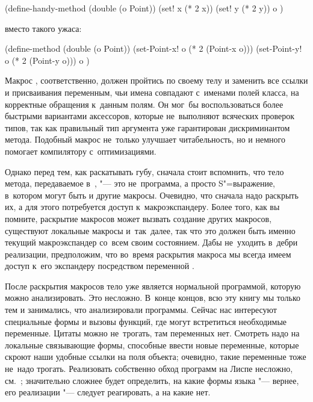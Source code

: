 \begin{code:lisp}
(define-handy-method (double (o Point))
  (set! x (* 2 x))
  (set! y (* 2 y))
  o )
\end{code:lisp}

\noindent
вместо такого ужаса:

\begin{code:lisp}
(define-method (double (o Point))
  (set-Point-x! o (* 2 (Point-x o)))
  (set-Point-y! o (* 2 (Point-y o)))
  o )
\end{code:lisp}

Макрос , соответственно, должен пройтись по своему телу
и заменить все ссылки и присваивания переменным, чьи имена совпадают с~именами
полей класса, на корректные обращения к~данным полям. Он мог~бы воспользоваться
более быстрыми вариантами аксессоров, которые не~выполняют всяческих проверок
типов, так как правильный тип аргумента уже гарантирован дискриминантом метода.
Подобный макрос не~только улучшает читабельность, но и немного помогает
компилятору с~оптимизациями.

Однако перед тем, как раскатывать губу, сначала стоит вспомнить, что тело
метода, передаваемое в~, "--- это не~программа, а просто
S"=выражение, в~котором могут быть и другие макросы. Очевидно, что сначала надо
раскрыть их, а для этого потребуется доступ к~макроэкспандеру. Более того, как
вы помните, раскрытие макросов может вызвать создание других макросов,
существуют локальные макросы и~так~далее, так что это должен быть именно текущий
макроэкспандер со~всем своим состоянием. Дабы не~уходить в~дебри реализации,
предположим, что во~время раскрытия макроса мы всегда имеем доступ к~его
экспандеру посредством переменной .

После раскрытия макросов тело  уже является нормальной
программой, которую можно анализировать. Это несложно. В~конце концов, всю эту
книгу мы только тем и занимались, что анализировали программы. Сейчас нас
интересуют специальные формы и вызовы функций, где могут встретиться необходимые
переменные. Цитаты можно не~трогать, там переменных нет. Смотреть надо на
локальные связывающие формы, способные ввести новые переменные, которые
скроют наши удобные ссылки на поля объекта; очевидно, такие переменные тоже
не~надо трогать. Реализовать собственно обход программ на Лиспе несложно,
см.~\cite{cur89,wat93}; значительно сложнее будет определить, на какие формы
языка "--- вернее, его реализации "--- следует реагировать, а на какие нет.

